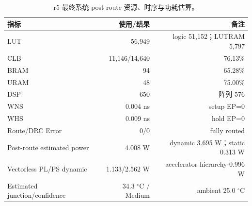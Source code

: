 \begin{table}[t]
\centering
\caption{r5 最终系统 post-route 资源、时序与功耗估算。}
\label{tab:resources}
\small
\begin{tabular}{lrr}
\toprule
指标 & 使用/结果 & 备注\\
\midrule
LUT & 56,949 & logic 51,152；LUTRAM 5,797 \\
CLB & 11,146/14,640 & 76.13\% \\
BRAM & 94 & 65.28\% \\
URAM & 48 & 75.00\% \\
DSP & 650 & 阵列 576 \\
WNS & 0.004 ns & setup EP=0 \\
WHS & 0.009 ns & hold EP=0 \\
Route/DRC Error & 0/0 & fully routed \\
Post-route estimated power & 4.008 W & dynamic 3.695 W；static 0.313 W \\
Vectorless PL/PS dynamic & 1.133/2.562 W & accelerator hierarchy 0.996 W \\
Estimated junction/confidence & 34.3 $^{\circ}$C / Medium & ambient 25.0 $^{\circ}$C \\
\bottomrule
\end{tabular}
\end{table}
